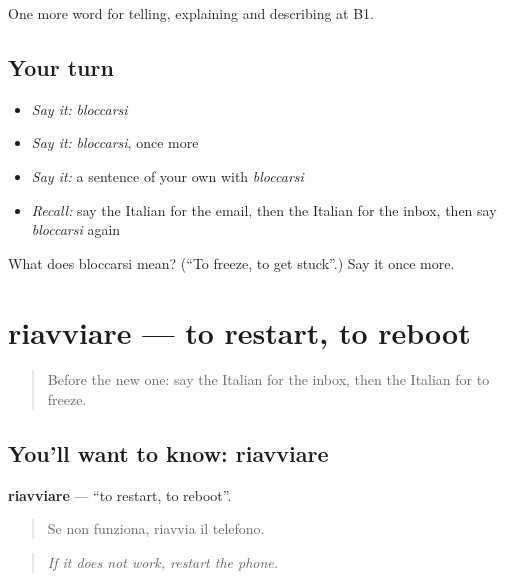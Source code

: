 \begin{grammarlens}[title={What you've built}]
One more word for telling, explaining and describing at B1.
\end{grammarlens}

\subsection*{Your turn}
\begin{itemize}
\raggedright
  \item \emph{Say it:} \emph{bloccarsi}
  \item \emph{Say it:} \emph{bloccarsi}, once more
  \item \emph{Say it:} a sentence of your own with \emph{bloccarsi}
  \item \emph{Recall:} say the Italian for the email, then the Italian for the inbox, then say \emph{bloccarsi} again
\end{itemize}

\begin{tcolorbox}[breakable,colback=teal!4,colframe=teal!35!black,title={Before you move on}]
What does bloccarsi mean? (\textquotedblleft{}To freeze, to get stuck\textquotedblright{}.) Say it once more.
\end{tcolorbox}
\section[riavviare]{riavviare — to restart, to reboot}

\label{lesson:IT-C404-riavviare}



\begin{quote}
Before the new one: say the Italian for the inbox, then the Italian for to freeze.
\end{quote}

\subsection*{You'll want to know: riavviare}
\textbf{riavviare} — \textquotedblleft{}to restart, to reboot\textquotedblright{}.

\begin{quote}
Se non funziona, riavvia il telefono.
\end{quote}

\begin{quote}
\emph{If it does not work, restart the phone.}
\end{quote}

